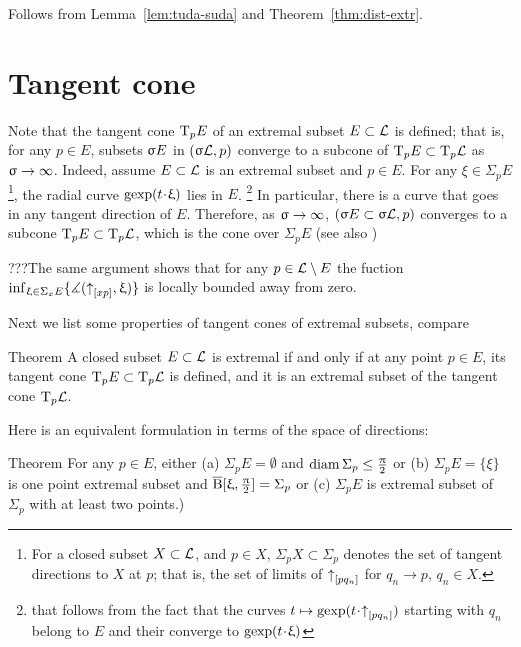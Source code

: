 Follows from Lemma~\ref{lem:tuda-suda} 
and Theorem~\ref{thm:dist-extr}.\qeds

\section{Tangent cone}

Note that the tangent cone \label{T_pE}$\text{\rm T}_p E$ of an extremal subset $E\subset \spc{L}$ is defined; 
that is,
for any $p\in E$, subsets $\upvarsigma E$ in $(\upvarsigma \mathcal{L},p)$ converge to a subcone of $\T_p E\subset \T_p \spc{L}$ as
$\lam\to\infty$.
Indeed, assume $E\subset \spc{L}$ is an extremal subset and $p\in E$.
For any $\xi\in \Sigma_p E$\footnote{\label{U_pX}For a closed subset $X\subset \spc{L}$, and $p\in X$, $\Sigma_p X\subset \Sigma_p$ denotes the set of tangent directions to $X$ at $p$; that is, the
set of limits of ${\uparrow}_{[{p}{q_n}]}$ for $q_n\to p$, $q_n\in X$.}, the radial curve $\gexp(t\cdot\xi)$ lies in $E$.%
\footnote{that follows from the fact that the curves 
$t\mapsto\gexp(t\cdot\dir p{q_n})$ starting with $q_n$ belong to $E$
and their converge to $\gexp(t\cdot\xi)$} 
In particular, there is a curve that goes in any tangent direction of $E$.
Therefore, as $\lam\to\infty$,  $(\lam E\subset \lam \spc{L},p)$ converges to
a subcone $\T_p E\subset \T_p \spc{L}$, which is the cone over $\Sigma_p E$ (see also
\cite[3.3]{perelman-petrunin:extremal})

???The same argument shows that for any $p\in \spc{L}\setminus E$ the fuction $\inf_{\xi\in\Sigma_xE}\{\mangle(\dir x p,\xi)\}$ is locally bounded away from zero.

Next we list some properties of tangent cones of extremal subsets, compare
\cite[1.4]{perelman-petrunin:extremal}

\begin{thm}{Theorem}
\label{ext-tangent} A closed subset $E\subset \spc{L}$ is  extremal if and only if 
at any point $p\in E$, its tangent cone $\T_p E\subset \T_p \spc{L}$ is defined,
and it is an extremal subset of the tangent cone $\text{\rm T}_p \mathcal{L}$.
\end{thm}

Here is an equivalent formulation in terms of the space of directions: 

\begin{thm}{Theorem}
For any $p\in E$,
either 
(a) $\Sigma_p E=\emptyset$ and $\diam \Sigma_p\le\tfrac\pi2$ or 
(b) $\Sigma_p E=\{\xi\}$ is one point extremal subset and $\overline{\mathrm{B}}{}[\upxi,\tfrac{\uppi}2]=\Sigma_p$
or
(c) $\Sigma_p E$ is extremal subset of $\Sigma_p$ with at least two points.)
\end{thm}

